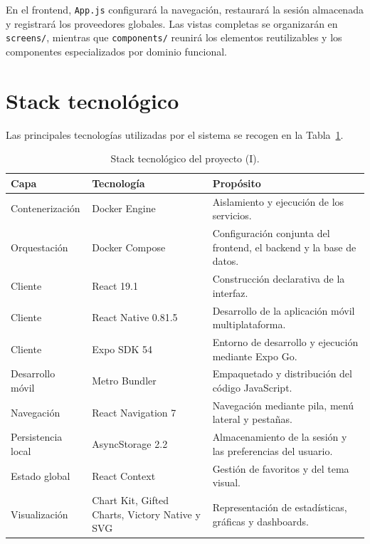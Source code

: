 En el frontend, \texttt{App.js} configurar\'a la navegaci\'on, restaurar\'a la
sesi\'on almacenada y registrar\'a los proveedores globales. Las vistas completas
se organizar\'an en \texttt{screens/}, mientras que \texttt{components/} reunir\'a
los elementos reutilizables y los componentes especializados por dominio
funcional.

\section{Stack tecnol\'ogico}

Las principales tecnolog\'ias utilizadas por el sistema se recogen en la
Tabla~\ref{tab:stack-tecnologico}.

\begin{table}[H]
\centering
\caption{Stack tecnol\'ogico del proyecto (I).}
\label{tab:stack-tecnologico}
\begin{tabular}{|p{2.8cm}|p{4cm}|p{6cm}|}
\hline
\textbf{Capa} & \textbf{Tecnolog\'ia} & \textbf{Prop\'osito} \\
\hline
Contenerizaci\'on & Docker Engine & Aislamiento y ejecuci\'on de los servicios. \\
\hline
Orquestaci\'on & Docker Compose & Configuraci\'on conjunta del frontend, el backend y la base de datos. \\
\hline
Cliente & React 19.1 & Construcci\'on declarativa de la interfaz. \\
\hline
Cliente & React Native 0.81.5 & Desarrollo de la aplicaci\'on m\'ovil multiplataforma. \\
\hline
Cliente & Expo SDK 54 & Entorno de desarrollo y ejecuci\'on mediante Expo Go. \\
\hline
Desarrollo m\'ovil & Metro Bundler & Empaquetado y distribuci\'on del c\'odigo JavaScript. \\
\hline
Navegaci\'on & React Navigation 7 & Navegaci\'on mediante pila, men\'u lateral y pesta\~nas. \\
\hline
Persistencia local & AsyncStorage 2.2 & Almacenamiento de la sesi\'on y las preferencias del usuario. \\
\hline
Estado global & React Context & Gesti\'on de favoritos y del tema visual. \\
\hline
Visualizaci\'on & Chart Kit, Gifted Charts, Victory Native y SVG & Representaci\'on de estad\'isticas, gr\'aficas y dashboards. \\
\hline
\end{tabular}
\end{table}

